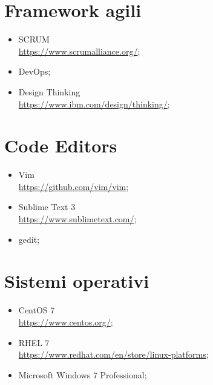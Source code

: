 \section{Framework agili}
\begin{itemize}
\item SCRUM\\
\href{https://www.scrumalliance.org/}{https://www.scrumalliance.org/};
\item DevOps;\\
\item Design Thinking\\
\href{https://www.ibm.com/design/thinking/}{https://www.ibm.com/design/thinking/};
\end{itemize}

\section{Code Editors}
\begin{itemize}
	\item Vim\\
	\href{https://github.com/vim/vim}{https://github.com/vim/vim};
	\item Sublime Text 3\\
	\href{https://www.sublimetext.com/}{https://www.sublimetext.com/};
	\item gedit;\\
\end{itemize}

\section{Sistemi operativi}
\begin{itemize}
	\item CentOS 7\\
	\href{https://www.centos.org/}{https://www.centos.org/};
	\item RHEL 7\\
	\href{https://www.redhat.com/en/store/linux-platforms}{https://www.redhat.com/en/store/linux-platforms};
	\item Microsoft Windows 7 Professional;\\
\end{itemize}
